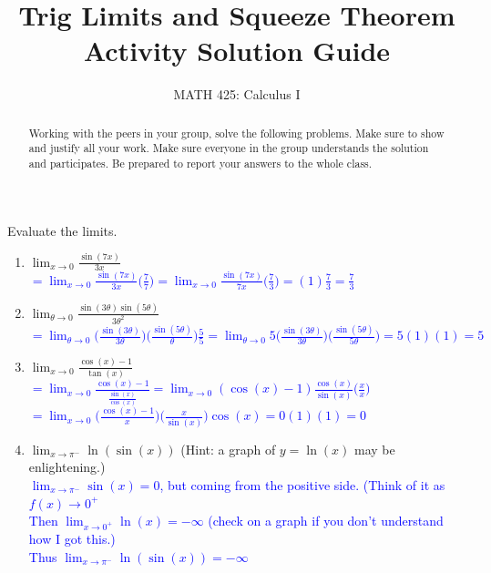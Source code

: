 \documentclass{ximera}
\title{Trig Limits and Squeeze Theorem Activity Solution Guide}
\author{MATH 425: Calculus I}
\begin{document}
\begin{abstract}
    Working with the peers in your group, solve the following problems. Make sure to show and justify all your work. Make sure everyone in the group understands the solution and participates. Be prepared to report your answers to the whole class. 
\end{abstract}
\maketitle


\begin{exercise}
    Evaluate the limits.
    \begin{enumerate}
        \item $\displaystyle \lim_{x\rightarrow 0}\frac{\sin(7x)}{3x}$\\
        \textcolor{blue}{$=\lim_{x\rightarrow 0} \frac{\sin(7x)}{3x}\bigg(\frac{7}{7}\bigg)=\lim_{x\rightarrow 0}\frac{\sin(7x)}{7x}\bigg(\frac{7}{3}\bigg)=(1)\frac{7}{3}=\frac{7}{3}$}

        \item $\displaystyle\lim_{\theta \rightarrow 0}\frac{\sin(3\theta)\sin(5\theta)}{3\theta^2}$\\
        \textcolor{blue}{$=\lim_{\theta\rightarrow 0}\bigg(\frac{\sin(3\theta)}{3\theta}\bigg)\bigg(\frac{\sin(5\theta)}{\theta}\bigg)\frac{5}{5}=\lim_{\theta\rightarrow 0}5\bigg(\frac{\sin(3\theta)}{3\theta}\bigg)\bigg(\frac{\sin(5\theta)}{5\theta}\bigg)=5(1)(1)=5$}

        \item $\displaystyle\lim_{x\rightarrow 0} \frac{\cos(x)-1}{\tan(x)}$\\
        \textcolor{blue}{$=\displaystyle\lim_{x\rightarrow 0}\frac{\cos(x)-1}{\frac{\sin(x)}{\cos(x)}}=\lim_{x\rightarrow 0}(\cos(x)-1)\frac{\cos(x)}{\sin(x)}\bigg(\frac{x}{x}\bigg)$\\
    $=\displaystyle \lim_{x\rightarrow 0}\bigg(\frac{\cos(x)-1}{x}\bigg)\bigg(\frac{x}{\sin(x)}\bigg)\cos(x)=0(1)(1)=0$}

        \item $\displaystyle\lim_{x\rightarrow \pi^-} \ln(\sin(x))$ (Hint: a graph of $y=\ln(x)$ may be enlightening.)\\
        \textcolor{blue}{$\displaystyle\lim_{x\rightarrow \pi^-}\sin(x)=0$, but coming from the positive side. (Think of it as $f(x)\rightarrow 0^+$\\
        Then $\displaystyle\lim_{x\rightarrow 0^+}\ln(x)=-\infty$ (check on a graph if you don't understand how I got this.) \\
        Thus $\displaystyle\lim_{x\rightarrow \pi^-} \ln(\sin(x))=-\infty$}
    \end{enumerate}  
    
\end{exercise}
\end{document}
